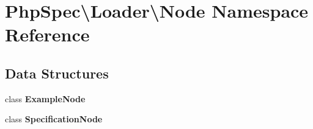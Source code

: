 \section{Php\+Spec\textbackslash{}Loader\textbackslash{}Node Namespace Reference}
\label{namespace_php_spec_1_1_loader_1_1_node}
\subsection*{Data Structures}
\begin{DoxyCompactItemize}
\item 
class {\bf Example\+Node}
\item 
class {\bf Specification\+Node}
\end{DoxyCompactItemize}
